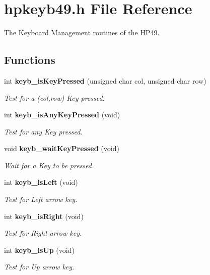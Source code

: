 \section{hpkeyb49.h File Reference}
\label{hpkeyb49_8h}
The Keyboard Management routines of the HP49. 


\subsection*{Functions}
\begin{CompactItemize}
\item 
int {\bf keyb\_\-is\-Key\-Pressed} (unsigned char col, unsigned char row)
\begin{CompactList}\small\item\em Test for a (col,row) Key pressed.\item\end{CompactList}\item 
int {\bf keyb\_\-is\-Any\-Key\-Pressed} (void)
\begin{CompactList}\small\item\em Test for any Key pressed.\item\end{CompactList}\item 
void {\bf keyb\_\-wait\-Key\-Pressed} (void)
\begin{CompactList}\small\item\em Wait for a Key to be pressed.\item\end{CompactList}\item 
int {\bf keyb\_\-is\-Left} (void)
\begin{CompactList}\small\item\em Test for Left arrow key.\item\end{CompactList}\item 
int {\bf keyb\_\-is\-Right} (void)
\begin{CompactList}\small\item\em Test for Right arrow key.\item\end{CompactList}\item 
int {\bf keyb\_\-is\-Up} (void)
\begin{CompactList}\small\item\em Test for Up arrow key.\item\end{CompactList}\item 

\end{CompactItemize}
